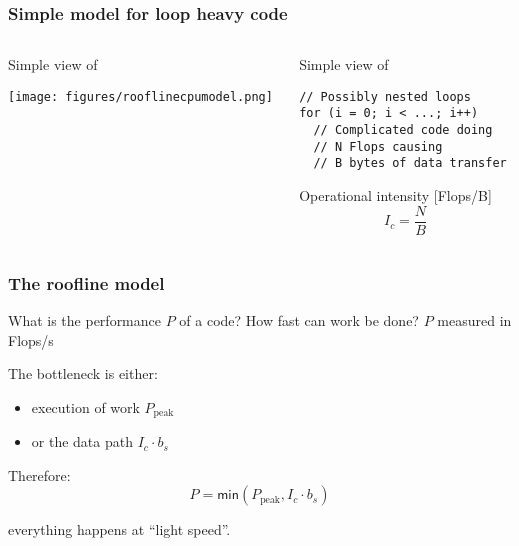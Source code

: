 \documentclass[dvipsnames,presentation,aspectratio=169,14pt]{beamer}
\begin{document}
\begin{frame}[fragile]
  \frametitle{Simple model for loop heavy code}
  \begin{columns}[t]
    \begin{column}{0.4\textwidth}
      Simple view of 
      \begin{center}
        \texttt{[image: figures/rooflinecpumodel.png]}
      \end{center}
    \end{column}
    \begin{column}{0.5\textwidth}
      Simple view of 

\begin{verbatim}
// Possibly nested loops
for (i = 0; i < ...; i++)
  // Complicated code doing
  // N Flops causing
  // B bytes of data transfer
\end{verbatim}

      \begin{block}{\small Operational intensity [Flops/B]}
        \begin{equation*}
          I_c = \frac{N}{B}
        \end{equation*}
      \end{block}
    \end{column}
  \end{columns}
\end{frame}

\begin{frame}
  \frametitle{The roofline model \hfill
    \href{https://doi.org/10.1145/1498765.1498785}{\faBook} \ \ \ }
  \begin{challenge}{What is the performance $P$ of a code?}
    How fast can work be done? $P$ measured in Flops/s
  \end{challenge}
  \pause
  \vskip 4pt
  The bottleneck is either:\\[-9pt]
  \begin{itemize}[itemsep=5pt]
  \item execution of work $P_{\text{peak}}$
  \item or the data path $I_c \cdot b_s$
  \end{itemize}
  \vskip 8pt

  Therefore:\\[-11pt]
  \begin{equation*}
    P = \mathsf{min}{(P_\text{peak}, I_c \cdot b_s)}
  \end{equation*}

  \pause
  \vskip 8pt

   everything happens at ``light speed''.

\end{frame}
\end{document}
